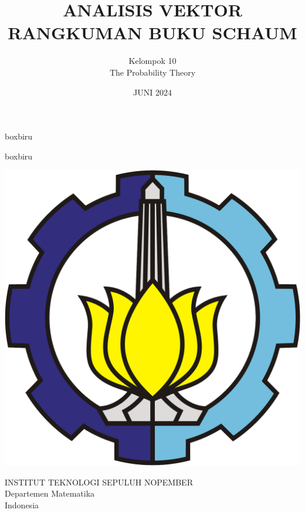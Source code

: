\documentclass[10pt]{beamer}
\title{ANALISIS VEKTOR RANGKUMAN BUKU SCHAUM}
\author{Kelompok 10\part{The Probability Theory}}
\institute{by Renaldy,Nicholas,Teo,Rico}
\date{JUNI 2024}
\begin{document}
\begin{frame}[plain]
    \transboxout
    \begin{beamercolorbox}[wd=\textwidth,rounded=true,shadow=true]{boxbiru}
        \centering
        \\[1.5ex]
    \end{beamercolorbox}
    
    \vspace*{2ex}
    
        \transboxout
    \begin{beamercolorbox}[wd=\textwidth,rounded=true,shadow=true]{boxbiru}
        \centering
        \\[0.5ex]
        
    \end{beamercolorbox}
    

    \vspace*{6ex}

    \centerline{\includegraphics[scale=.1]{logoITS}}

    \vspace*{2ex}

    \begin{center}
    \tiny
    \rm
    \color{magenta!50!cyan!100}
    INSTITUT TEKNOLOGI SEPULUH NOPEMBER\\
    Departemen Matematika\\
    Indonesia\\
    \end{center}
\end{frame}%
\end{document}
